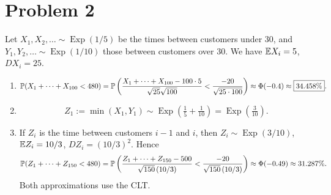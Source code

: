 \documentclass[a4paper]{article}
\begin{document}
\begin{center}
\end{center}

\section*{Problem 2}
Let $X_1,X_2,\dots\sim\operatorname{Exp}(1/5)$ be the times between customers under 30, and $Y_1,Y_2,\dots\sim\operatorname{Exp}(1/10)$ those between customers over 30. We have $\E X_i=5$, $DX_i=25$.
\begin{enumerate}
\item
\[
\P(X_1+\dots+X_{100}<480)
=\P\left(\frac{X_1+\dots+X_{100}-100\cdot5}{\sqrt{25}\sqrt{100}}
<\frac{-20}{\sqrt{25\cdot100}}\right)
\approx\Phi(-0.4)\approx\boxed{34.458\%}.
\]
\item
\[
Z_1:=\min(X_1,Y_1)\sim\operatorname{Exp}(\tfrac15+\tfrac1{10})
=\operatorname{Exp}(\tfrac3{10}).
\]
\item If $Z_i$ is the time between customers $i-1$ and $i$, then
$Z_i\sim\operatorname{Exp}(3/10)$, $\E Z_i=10/3$, $DZ_i=(10/3)^2$. Hence
\[
\P(Z_1+\dots+Z_{150}<480)
=\P\left(\frac{Z_1+\dots+Z_{150}-500}{\sqrt{150}\,(10/3)}
<\frac{-20}{\sqrt{150}\,(10/3)}\right)
\approx\Phi(-0.49)\approx31.287\%.
\]
Both approximations use the CLT.
\end{enumerate}
\end{document}
